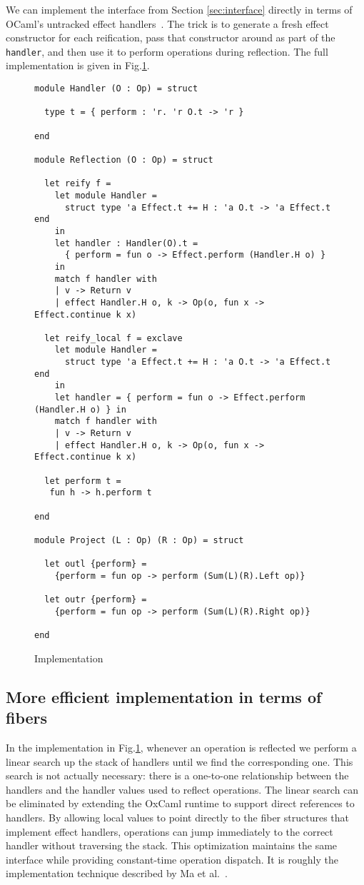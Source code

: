 \documentclass[acmsmall, screen, review, anonymous]{acmart}
\theoremstyle{definition}
\begin{document}
We can implement the interface from Section \ref{sec:interface} directly
in terms of OCaml's untracked effect
handlers~\cite{Sivaramakrishnan2021retrofitting}. The trick is to
generate a fresh effect constructor for each reification, pass that
constructor around as part of the \lstinline[style=oxcaml]{handler}, and
then use it to perform operations during reflection. The full implementation
is given in Fig.\ref{fig:implementation}.

\begin{figure}
\begin{lstlisting}[style=oxcaml]
module Handler (O : Op) = struct

  type t = { perform : 'r. 'r O.t -> 'r }

end

module Reflection (O : Op) = struct

  let reify f =
    let module Handler =
      struct type 'a Effect.t += H : 'a O.t -> 'a Effect.t end
    in
    let handler : Handler(O).t =
      { perform = fun o -> Effect.perform (Handler.H o) }
    in
    match f handler with
    | v -> Return v
    | effect Handler.H o, k -> Op(o, fun x -> Effect.continue k x)

  let reify_local f = exclave
    let module Handler =
      struct type 'a Effect.t += H : 'a O.t -> 'a Effect.t end
    in
    let handler = { perform = fun o -> Effect.perform (Handler.H o) } in
    match f handler with
    | v -> Return v
    | effect Handler.H o, k -> Op(o, fun x -> Effect.continue k x)

  let perform t =
   fun h -> h.perform t

end

module Project (L : Op) (R : Op) = struct

  let outl {perform} =
    {perform = fun op -> perform (Sum(L)(R).Left op)}

  let outr {perform} =
    {perform = fun op -> perform (Sum(L)(R).Right op)}

end
\end{lstlisting}
\caption{Implementation}
\label{fig:implementation}
\end{figure}

\subsection{More efficient implementation in terms of fibers}

In the implementation in Fig.\ref{fig:implementation}, whenever an
operation is reflected we perform a linear search up the stack of
handlers until we find the corresponding one. This search is not
actually necessary: there is a one-to-one relationship between the
handlers and the handler values used to reflect operations. The linear
search can be eliminated by extending the OxCaml runtime to support
direct references to handlers. By allowing local values to point
directly to the fiber structures that implement effect handlers,
operations can jump immediately to the correct handler without
traversing the stack. This optimization maintains the same interface
while providing constant-time operation dispatch. It is roughly the
implementation technique described by Ma et al.~\cite{ma2024lexical}.
\end{document}
